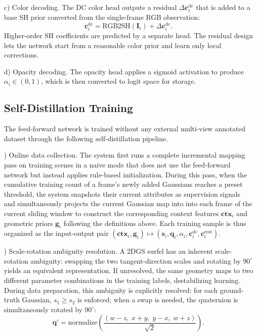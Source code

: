 \documentclass[letterpaper,journal]{IEEEtran}
\begin{document}
\vspace{0.25em}
\noindent c) Color decoding. The DC color head outputs a residual $\Delta \mathbf{c}_i^{\text{dc}}$ that is added to a base SH prior converted from the single-frame RGB observation:
%
\begin{equation}
\mathbf{c}_i^{\text{dc}} = \text{RGB2SH}(\mathbf{I}_i) + \Delta \mathbf{c}_i^{\text{dc}}.
\end{equation}
%
Higher-order SH coefficients are predicted by a separate head. The residual design lets the network start from a reasonable color prior and learn only local corrections.

\vspace{0.25em}
\noindent d) Opacity decoding. The opacity head applies a sigmoid activation to produce $\alpha_i \in (0,1)$, which is then converted to logit space for storage.

\subsection{Self-Distillation Training}

The feed-forward network is trained without any external multi-view annotated dataset through the following self-distillation pipeline.

\vspace{0.35em}
) Online data collection. The system first runs a complete incremental mapping pass on training scenes in a naive mode that does not use the feed-forward network but instead applies rule-based initialization. During this pass, when the cumulative training count of a frame's newly added Gaussians reaches a preset threshold, the system snapshots their current attributes as supervision signals and simultaneously projects the current Gaussian map into into each frame of the current sliding window to construct the corresponding context features $\mathbf{ctx}_i$ and geometric priors $\mathbf{g}_i$ following the definitions above. Each training sample is thus organized as the input-output pair $(\mathbf{ctx}_i, \mathbf{g}_i) \mapsto (\mathbf{s}_i, \mathbf{q}_i, \alpha_i, \mathbf{c}_i^{\mathrm{dc}}, \mathbf{c}_i^{\mathrm{rest}})$.

\vspace{0.35em}
) Scale-rotation ambiguity resolution. A 2DGS surfel has an inherent scale-rotation ambiguity: swapping the two tangent-direction scales and rotating by $90^\circ$ yields an equivalent representation. If unresolved, the same geometry maps to two different parameter combinations in the training labels, destabilizing learning. During data preparation, this ambiguity is explicitly resolved: for each ground-truth Gaussian, $s_1 \geq s_2$ is enforced; when a swap is needed, the quaternion is simultaneously rotated by $90^\circ$:
%
\begin{equation}
\mathbf{q}' = \text{normalize}\left(\frac{(w{-}z,\; x{+}y,\; y{-}x,\; w{+}z)}{\sqrt{2}}\right).
\end{equation}
\end{document}
